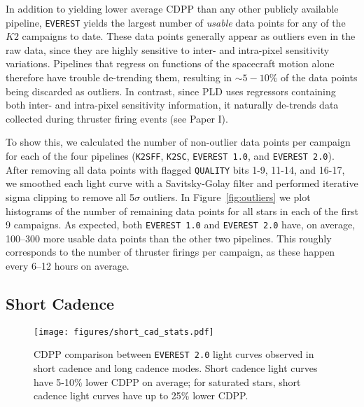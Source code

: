 \documentclass[]{emulateapj}
\begin{document}
In addition to yielding lower average CDPP than any other publicly available pipeline,
\texttt{EVEREST} yields the largest number of \emph{usable} data points for any of the
$K2$ campaigns to date. These data points generally appear as outliers even in the
raw data, since they are highly sensitive to inter- and intra-pixel sensitivity variations.
Pipelines that regress on functions of the spacecraft motion alone therefore have trouble
de-trending them, resulting in ${\sim}5-10\%$ of the data points being discarded as outliers.
In contrast, since PLD uses regressors containing both inter- and intra-pixel sensitivity
information, it naturally de-trends data collected during thruster firing events (see Paper I).

To show this, we calculated the number of non-outlier data points per campaign
for each of the four pipelines (\texttt{K2SFF}, \texttt{K2SC}, \texttt{EVEREST 1.0}, and
\texttt{EVEREST 2.0}). After removing all data points with flagged \texttt{QUALITY}
bits 1-9, 11-14, and 16-17, we smoothed each light curve with a Savitsky-Golay filter and
performed iterative sigma clipping to remove all 5$\sigma$ outliers. In Figure~\ref{fig:outliers}
we plot histograms of the number of remaining data points for all stars in each of the first
9 campaigns. As expected, both \texttt{EVEREST 1.0} and \texttt{EVEREST 2.0} have, on 
average, 100--300 more usable data points than the other two pipelines. This roughly
corresponds to the number of thruster firings per campaign, as these happen every 6--12
hours on average.

\subsection{Short Cadence}
\label{sec:shortcad}

\begin{figure}[hbt]
  \begin{center}
      \texttt{[image: figures/short\_cad\_stats.pdf]}
       \caption{CDPP comparison between \texttt{EVEREST 2.0} light curves
       observed in short cadence and long cadence modes. Short cadence
       light curves have 5-10\% lower CDPP on average; for saturated stars,
       short cadence light curves have up to 25\% lower CDPP.}
     \label{fig:short_cad_stats}
  \end{center}
\end{figure}
\end{document}
